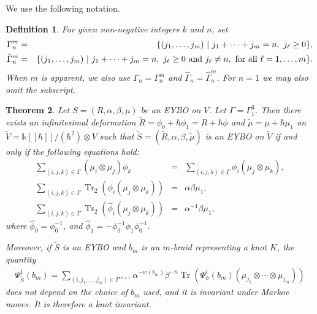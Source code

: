 \documentclass[11pt,fleqn]{amsart} %
\DeclareMathOperator{\tr}{Tr}
\newtheorem{theorem}{Theorem}[section]
\newtheorem{definition}[theorem]{Definition}
\begin{document}
We use the following notation.

\begin{definition}\label{def:gamma}
	{\rm 
		For given non-negative integers $k$ and $n$, set 
\begin{eqnarray*}
					\Gamma_n^m &=& \{(j_1,\ldots,j_m )\ |\  j_1+\cdots +j_m = n, \  j_\ell \geq 0 \}, \\
					\hat\Gamma_n^m  &=& \{(j_1,\ldots,j_m )\ |\  j_1+\cdots +j_m= n, \  j_\ell \geq 0\ {\rm and}\  j_\ell \neq n,\ {\rm for\ all}\ \ell=1,\ldots,m \}.
\end{eqnarray*}
When $m$ is apparent, we also use $\Gamma_n=\Gamma_n^m$ and $\hat\Gamma_n=\hat\Gamma_n^m$. For $n=1$ we may also omit the subscript. 
}
\end{definition}


\begin{theorem}\label{thm:inf_YB_inv}
Let $S = (R, \alpha, \beta, \mu)$ be an EYBO on $V$. Let $\Gamma=\Gamma^3_1$. 
Then there exists  an infinitesimal deformation $\tilde R=\phi_0 + \hbar \phi_1=R + \hbar \phi$
and $\tilde \mu = \mu + \hbar \mu_1 $ on $\tilde V= {\mathbb k} [[ \hbar ]] / (\hbar^2 )  \otimes V $ such that
$\tilde S = (\tilde R, \alpha, \beta, \tilde \mu ) $ is an EYBO on $\tilde V$ 
if and only if the following equations hold:
	\begin{eqnarray}
			\sum_{(i,j,k)\in \Gamma} (\mu_i\otimes \mu_j)\phi_k &=& \sum_{(i,j,k)\in \Gamma} \phi_i (\mu_j\otimes \mu_k),\label{eqn:inf_mu_comm}\\
			\sum_{(i,j,k)\in \Gamma}\tr_2(\phi_i(\mu_j\otimes \mu_k)) &=& \alpha\beta \mu_1,\label{eqn:inf_partial_tr+}\\
			\sum_{(i,j,k)\in \Gamma}\tr_2(\hat \phi_i(\mu_j\otimes \mu_k)) &=& \alpha^{-1}\beta \mu_1,\label{eqn:inf_partial_tr-}
	\end{eqnarray}
	where $\hat \phi_0 = \phi_0^{-1}$, and $\hat \phi_1 = -\phi_0^{-1}\phi_1\phi_0^{-1}$. 
	
	Moreover, if $\tilde S$ is an EYBO and 
		$b_m$ is an $m$-braid  representing a knot $K$, the quantity 
	\begin{eqnarray}
		\Psi^{1 }_{\tilde S}(b_m) = 			\sum_{(i,j_1,\ldots,j_m)\in \Gamma^{m+1}} \alpha^{-w(b_m)}\beta^{-n}\tr (\Psi^i_\phi(b_m)( \mu_{j_1}\otimes \cdots \otimes \mu_{j_m})) \label{eqn:inv_deg1}
	\end{eqnarray} 
does not depend on  the choice of $b_m$ used, and it is invariant under Markov moves. It is therefore a knot invariant. 
\end{theorem}
\end{document}
